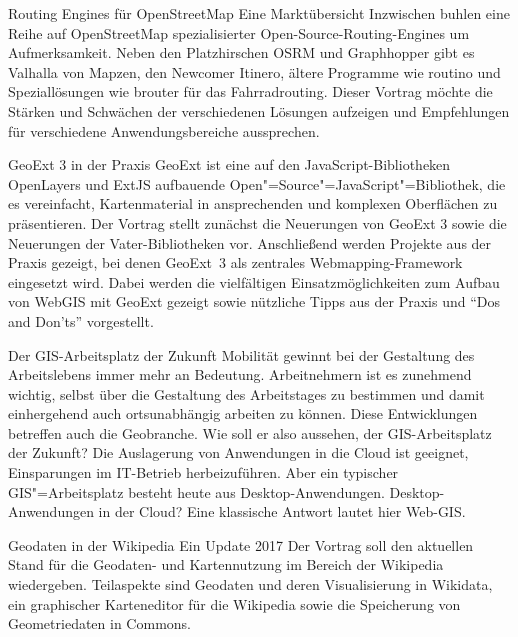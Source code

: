 %
{Routing Engines für OpenStreetMap}%
{Eine Marktübersicht}%
{Inzwischen buhlen eine Reihe auf OpenStreetMap spezialisierter Open-Source-Routing-Engines um
Aufmerksamkeit. Neben den Platzhirschen OSRM und Graphhopper gibt es Valhalla von Mapzen, den
Newcomer Itinero, ältere Programme wie routino und Speziallösungen wie brouter für das
Fahrradrouting. Dieser Vortrag möchte die Stärken und Schwächen der verschiedenen Lösungen aufzeigen
und Empfehlungen für verschiedene Anwendungsbereiche aussprechen.}
\enlargethispage{0.2\baselineskip}
\vspace{-0.5\baselineskip}




%
{GeoExt 3 in der Praxis}%
{}%
{GeoExt ist eine auf den JavaScript-Bibliotheken Open\-Lay\-ers und ExtJS aufbauende
  Open"=Source"=JavaScript"=Bibliothek, die es vereinfacht, Kartenmaterial in ansprechenden und komplexen
  Oberflächen zu präsentieren.  Der Vortrag stellt zunächst die Neuerungen von GeoExt 3 sowie die
  Neuerungen der Vater-Bibliotheken
vor.  Anschließend werden Projekte aus der Praxis gezeigt, bei denen GeoExt~3 als zentrales
Webmapping-Framework eingesetzt wird. Dabei werden die vielfältigen Einsatzmöglichkeiten zum Aufbau
von WebGIS mit GeoExt gezeigt sowie nützliche Tipps aus der Praxis und "`Dos and Don'ts"'
vorgestellt.}

%
{Der GIS-Arbeitsplatz der Zukunft}%
{}%
{Mobilität gewinnt bei der Gestaltung des Arbeitslebens immer mehr an Bedeutung. Arbeitnehmern ist
es zunehmend wichtig, selbst über die Gestaltung des Arbeitstages zu bestimmen und damit
einhergehend auch ortsunabhängig arbeiten zu können. Diese Entwicklungen betreffen auch die
Geobranche. Wie soll er also aussehen, der GIS-Arbeitsplatz der Zukunft?  Die Auslagerung von
Anwendungen in die Cloud ist geeignet, Einsparungen im IT-Betrieb herbeizuführen. Aber ein typischer
GIS"=Arbeitsplatz besteht heute aus Desktop-Anwendungen. Desktop-Anwendungen in der Cloud? Eine
klassische Antwort lautet hier Web-GIS.}

%
{Geodaten in der Wikipedia}%
{Ein Update 2017}%
{Der Vortrag soll den aktuellen Stand für die Geodaten- und Kartennutzung im Bereich der Wikipedia
wiedergeben. Teilaspekte sind Geodaten und deren Visualisierung in Wikidata, ein graphischer
Karteneditor für die Wikipedia sowie die Speicherung von Geometriedaten in Commons.  }


